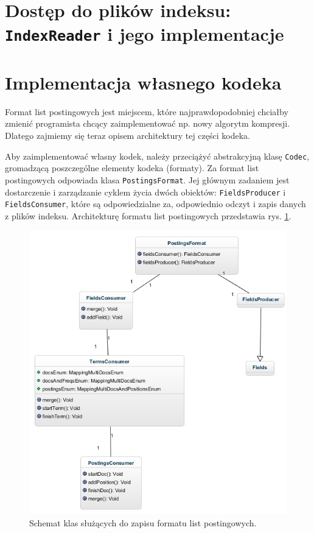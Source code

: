 \section{Dostęp do plików indeksu: \texttt{IndexReader} i jego implementacje}
\label{sec:indexReader}

\section{Implementacja własnego kodeka}

Format list postingowych jest miejscem, które najprawdopodobniej chciałby zmienić programista chcący zaimplementować np. nowy algorytm kompresji. Dlatego zajmiemy się teraz opisem architektury tej części kodeka. 

Aby zaimplementować własny kodek, należy przeciążyć abstrakcyjną klasę \texttt{Codec}, gromadzącą poszczególne elementy kodeka (formaty). Za format list postingowych odpowiada klasa \texttt{PostingsFormat}. Jej głównym zadaniem jest dostarczenie i zarządzanie cyklem życia dwóch obiektów: \texttt{FieldsProducer} i \texttt{FieldsConsumer}, które są odpowiedzialne za, odpowiednio odczyt i zapis danych z plików indeksu. Architekturę formatu list postingowych przedstawia rys. \ref{postingFormat}.

\begin{figure}[here]
 \label{postingFormat}
 \includegraphics[scale=0.6]{PostingsFormat.jpg}
 \caption{Schemat klas służących do zapisu formatu list postingowych.}
\end{figure}

